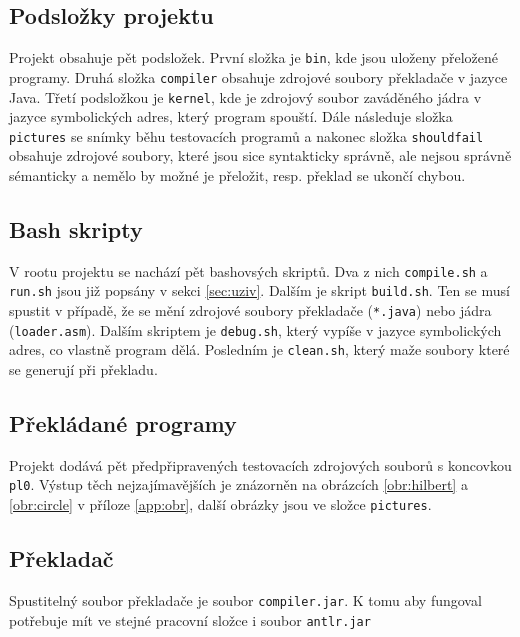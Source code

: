 \documentclass[a4paper]{article}
\begin{document}
\subsection{Podslo\v{z}ky projektu}
Projekt obsahuje p\v{e}t podslo\v{z}ek. Prvn\'i slo\v{z}ka je \texttt{bin},
kde jsou ulo\v{z}eny p\v{r}elo\v{z}en\'e programy. Druh\'a slo\v{z}ka
\texttt{compiler} obsahuje zdrojov\'e soubory p\v{r}eklada\v{c}e v jazyce
Java. T\v{r}et\'i podslo\v{z}kou je \texttt{kernel}, kde je zdrojov\'y soubor
zav\'ad\v{e}n\'eho j\'adra v jazyce symbolick\'ych adres, kter\'y program
spou\v{s}t\'i. D\'ale n\'asleduje slo\v{z}ka \texttt{pictures} se sn\'imky
b\v{e}hu testovac\'ich program\r{u} a nakonec slo\v{z}ka \texttt{shouldfail}
obsahuje zdrojov\'e soubory, kter\'e jsou sice syntakticky spr\'av\-n\v{e},
ale nejsou spr\'av\-n\v{e} s\'emanticky a nem\v{e}lo by mo\v{z}n\'e je
p\v{r}elo\v{z}it, resp. p\v{r}eklad se ukon\v{c}\'i chybou.
\subsection{Bash skripty}
V rootu projektu se nach\'az\'i p\v{e}t bashovs\'ych skript\r{u}. Dva z nich
\texttt{compile.sh} a \texttt{run.sh} jsou ji\v{z} pops\'any v
sekci \ref{sec:uziv}. Dal\v{s}\'im je skript \texttt{build.sh}. Ten se
mus\'i spustit v p\v{r}\'ipad\v{e}, \v{z}e se m\v{e}n\'i zdrojov\'e
soubory p\v{r}eklada\v{c}e (\texttt{*.java}) nebo j\'adra (\texttt{loader.asm}).
Dal\v{s}\'im skriptem je \texttt{debug.sh}, kter\'y vyp\'i\v{s}e v
jazyce symbolick\'ych adres, co vlastn\v{e} program d\v{e}l\'a.
Posledn\'im je \texttt{clean.sh}, kter\'y ma\v{z}e soubory kter\'e
se generuj\'i p\v{r}i p\v{r}ekladu.
\subsection{P\v{r}ekl\'adan\'e programy}
Projekt dod\'av\'a p\v{e}t p\v{r}edp\v{r}ipraven\'ych testovac\'ich zdrojov\'ych
soubor\r{u} s koncovkou \texttt{pl0}. V\'ystup t\v{e}ch
nejzaj\'imav\v{e}j\v{s}\'ich je zn\'azorn\v{e}n na obr\'azc\'ich
\ref{obr:hilbert} a \ref{obr:circle} v p\v{r}\'iloze \ref{app:obr}, dal\v{s}\'i
obr\'azky jsou ve slo\v{z}ce \texttt{pictures}.
\subsection{P\v{r}eklada\v{c}}
Spustiteln\'y soubor p\v{r}eklada\v{c}e je soubor \texttt{compiler.jar}. K tomu
aby fungoval pot\v{r}ebuje m\'it ve stejn\'e pracovn\'i slo\v{z}ce i soubor
\texttt{antlr.jar}
\end{document}
